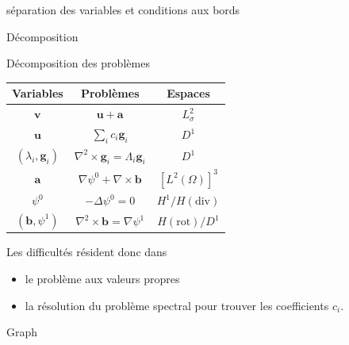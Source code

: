 \documentclass{beamer}
\newcommand{\grad}{{\nabla}}
\newcommand{\laplace}{{\Delta}}
\newcommand{\rot}{{\nabla\times}}
\newcommand{\rott}{{\nabla^2\times}}
\renewcommand{\div}{{\nabla\cdot}}
\begin{document}
\begin{frame}
séparation des variables et conditions aux bords
\end{frame}

\begin{frame}{Décomposition}
\begin{block}{Décomposition des problèmes}
\begin{center}
\begin{tabular}{|c|c|c|}
\hline
Variables & Problèmes & Espaces\\ \hline
$\mathbf{v}$ & $\mathbf{u} + \mathbf{a}$ & $ L^2_\sigma$\\ \hline
$\mathbf{u}$ & $\sum_i c_i\mathbf{g}_i$ & $ D^1$\\ \hline
$(\lambda_i,\mathbf{g}_i)$ & $\rott  \mathbf{g}_i = \Lambda_i \mathbf{g}_i$ & $ D^1$ \\ \hline
$\mathbf{a}$ & $\grad\psi^0 + \rot \mathbf{b}$ & $ [L^2(\Omega)]^3$\\ \hline
$\psi^0$ & $-\laplace\psi^0 = 0$ & $ H^1/ H(\mathrm{div})$\\ \hline
$(\mathbf{b},\psi^1)$ & $\rott \mathbf{b}= \grad\psi^1$ & $ H(\mathrm{rot})/ D^1$ \\ \hline
\end{tabular}
\end{center}
\end{block}
Les difficultés résident donc dans
\begin{itemize}
\item le problème aux valeurs propres
\item la résolution du problème spectral pour trouver les coefficients $c_i$.
\end{itemize}
\end{frame}

\begin{frame}
Graph
\end{frame}
\end{document}
